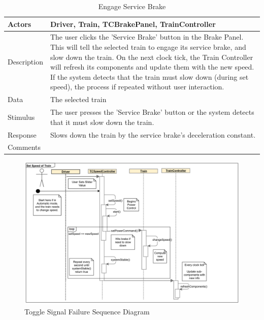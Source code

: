 \documentclass[]{article}
\begin{document}
\begin{table}[H]
	\centering
	\caption{Engage Service Brake}
	\begin{tabular}{|l|l|}
		\hline
		Actors & \parbox[t]{10cm}{Driver, Train, TCBrakePanel, TrainController} \\ \hline
		Description & \parbox[t]{10cm}{The user clicks the 'Service Brake' button in the Brake Panel. This will tell the selected train to engage its service brake, and slow down the train. On the next clock tick, the Train Controller will refresh its components and update them with the new speed. If the system detects that the train must slow down (during set speed), the process if repeated without user interaction. } \\ \hline
		Data &  \parbox[t]{10cm}{The selected train} \\ \hline
		Stimulus &  \parbox[t]{10cm}{ The user presses the 'Service Brake' button or the system detects that it must slow down the train. } \\ \hline
		Response & \parbox[t]{10cm}{Slows down the train by the service brake's deceleration constant. }\\ \hline
		Comments & \parbox[t]{10cm}{}  \\ \hline
	\end{tabular}
\end{table}

\begin{figure}[H]
	\centering
	\includegraphics[width=\textwidth]{tc_setSpeed_usecase}
	\caption{Toggle Signal Failure Sequence Diagram}
\end{figure}
\end{document}
